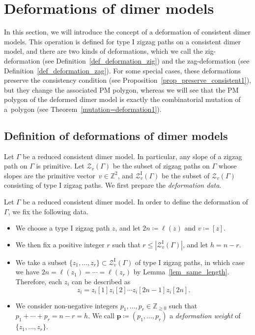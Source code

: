 \documentclass[11pt]{article}
\numberwithin{equation}{section}
\numberwithin{equation}{section}
\numberwithin{figure}{section}
\numberwithin{table}{section}
\newcommand{\ZZ}{\mathbb{Z}}
\newcommand{\rmI}{\mathrm{I}}
\newcommand{\calZ}{\mathcal{Z}}
\newcommand{\bfp}{\mathbf{p}}
\begin{document}
\section{Deformations of dimer models}\label{sec_def_deform}

In this section, we will introduce the concept of a deformation of consistent dimer models.
This operation is defined for type I zigzag paths on a consistent dimer model, and there are two kinds of deformations,
which we call the zig-deformation (see Definition~\ref{def_deformation_zig}) and the zag-deformation (see Definition~\ref{def_deformation_zag}).
For some special cases, these deformations preserve the consistency condition (see Proposition~\ref{prop_preserve_consistent1}),
but they change the associated PM polygon, whereas we will see that the PM polygon of the deformed dimer model is exactly the combinatorial mutation of a~polygon (see Theorem~\ref{mutation=deformation1}).

\subsection{Definition of deformations of dimer models}\label{subsec_def_deform}

Let $\Gamma$ be a reduced consistent dimer model.
In particular, any slope of a zigzag path on $\Gamma$ is primitive.
Let $\calZ_v(\Gamma)$ be the subset of zigzag paths on $\Gamma$ whose slopes are the primitive vector~$v\in\ZZ^2$,
and $\calZ_v^\rmI(\Gamma)$ be the subset of $\calZ_v(\Gamma)$ consisting of type I zigzag paths.
We first prepare the \emph{deformation data}.

\begin{Definition}\label{def_deformation_data}
Let $\Gamma$ be a reduced consistent dimer model. In order to define the deformation of $\Gamma$, we fix the following data.
\begin{itemize}\itemsep=0pt
\item[(1)] We choose a type I zigzag path $z$, and let $2n\coloneqq\ell(z)$ and $v\coloneqq [z]$.
\item[(2)] We then fix a positive integer $r$ such that $r\le |\calZ_v^\rmI(\Gamma)|$, and let $h=n-r$.
\item[(3)] We take a subset $\{z_1,\dots,z_r\}\subset\calZ_v^\rmI(\Gamma)$ of type I zigzag paths, in which case we have $2n=\ell(z_1)=\cdots=\ell(z_r)$ by Lemma~\ref{lem_same_length}.
Therefore, each $z_i$ can be described as
\begin{displaymath} z_i=z_i[1]z_i[2]\cdots z_i[2n-1]z_i[2n]. \end{displaymath}
\item[(4)]
We consider non-negative integers $p_1,\dots,p_r\in\ZZ_{\ge0}$ such that $p_1+\cdots+p_r=n-r=h$.
We call $\bfp\coloneqq(p_1,\dots,p_r)$ a \emph{deformation weight} of $\{z_1, \dots, z_r\}$.
\end{itemize}
\end{Definition}
\end{document}
